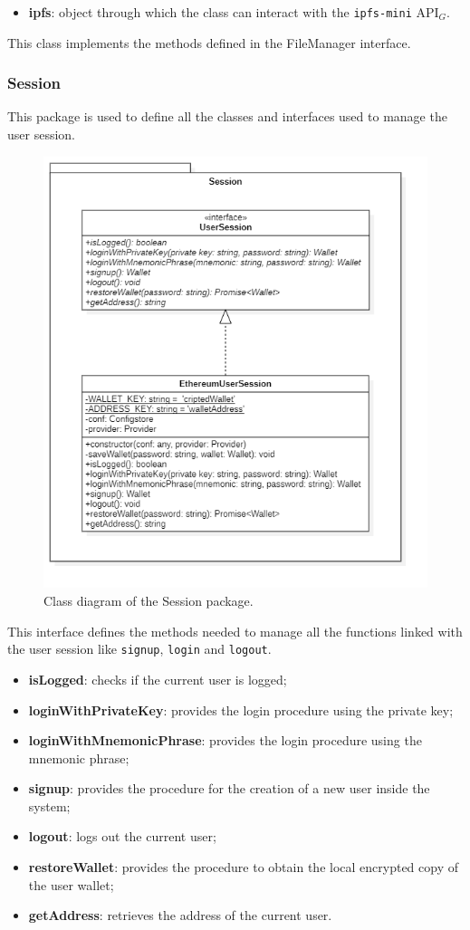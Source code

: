 				\begin{itemize}
					\item \textbf{ipfs}: object through which the class can interact with the \texttt{ipfs-mini} API$_{G}$.
				\end{itemize}

				This class implements the methods defined in the FileManager interface.

		\subsubsection{Session}
		This package is used to define all the classes and interfaces used to manage the user session.
		\begin{figure} [h!]
			\centering
			\includegraphics[width=0.5\linewidth]{diagrammi/etherless-cli/Session}
			\caption{Class diagram of the Session package.}
		\end{figure}

			This interface defines the methods needed to manage all the functions linked with the user session like \texttt{signup}, \texttt{login} and \texttt{logout}.
				\begin{itemize}
					\item \textbf{isLogged}: checks if the current user is logged;
					\item \textbf{loginWithPrivateKey}: provides the login procedure using the private key;
					\item \textbf{loginWithMnemonicPhrase}: provides the login procedure using the mnemonic phrase;
					\item \textbf{signup}: provides the procedure for the creation of a new user inside the system;
					\item \textbf{logout}: logs out the current user;
					\item \textbf{restoreWallet}: provides the procedure to obtain the local encrypted copy of the user wallet;
					\item \textbf{getAddress}: retrieves the address of the current user.
				\end{itemize}

